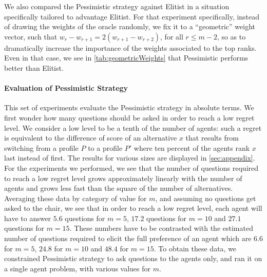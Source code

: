 \documentclass{article}
\begin{document}
We also compared the Pessimistic strategy against Elitist in a situation specifically tailored to advantage Elitist. For that experiment specifically, instead of drawing the weights of the oracle randomly, we fix it to a “geometric” weight vector, such that $w_r - w_{r + 1} = 2(w_{r + 1} - w_{r + 2})$, for all $r ≤ m - 2$, so as to dramatically increase the importance of the weights associated to the top ranks. Even in that case, we see in \cref{tab:geometricWeights} that Pessimistic performs better than Elitist.

\paragraph{Evaluation of Pessimistic Strategy}
\label{sec:lowRegret}
This set of experiments evaluate the Pessimistic strategy in absolute terms. 
We first wonder how many questions should be asked in order to reach a low regret level. We consider a low level to be a tenth of the number of agents: such a regret is equivalent to the difference of score of an alternative $x$ that results from switching from a profile $P$ to a profile $P'$ where ten percent of the agents rank $x$ last instead of first.
The results for various sizes are displayed in \cref{sec:appendix}. 
For the experiments we performed, we see that the number of questions required to reach a low regret level grows approximately linearly with the number of agents and grows less fast than the square of the number of alternatives. Averaging these data by category of value for $m$, and assuming no questions get asked to the chair, we see that in order to reach a low regret level, each agent will have to answer $5.6$ questions for $m = 5$, $17.2$ questions for $m = 10$ and $27.1$ questions for $m = 15$. These numbers have to be contrasted with the estimated number of questions required to elicit the full preference of an agent which are $6.6$ for $m=5$, $24.8$ for $m=10$ and $48.4$ for $m=15$. To obtain these data, we constrained Pessimistic strategy to ask questions to the agents only, and ran it on a single agent problem, with various values for $m$.

\end{document}
